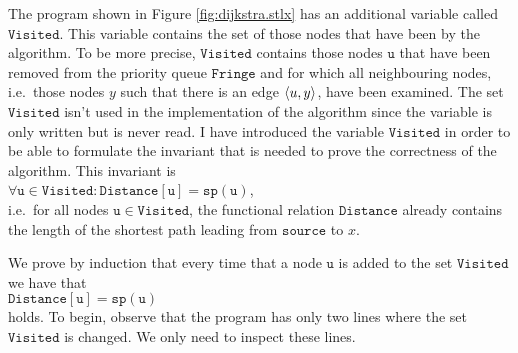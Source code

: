 The program shown in Figure \ref{fig:dijkstra.stlx} has an additional variable called $\mathtt{Visited}$.
This variable contains the set of those nodes that have been   by the algorithm.
To be more precise, $\mathtt{Visited}$ contains those nodes $\mathtt{u}$ that have been removed from the
priority queue $\mathtt{Fringe}$ and for which all neighbouring nodes, i.e.~those nodes $y$ such that
there is an edge $\pair(u,y)$, have been examined.
The set $\mathtt{Visited}$ isn't used in the implementation of the algorithm since the variable is
only written but is never read.
I have introduced the variable $\mathtt{Visited}$ in order to be able to formulate the invariant that
is needed to prove the correctness of the algorithm.  This invariant is
\\[0.2cm]
\hspace*{1.3cm}
$\forall \mathtt{u}\in\mathtt{Visited}: \mathtt{Distance}[\mathtt{u}] = \mathtt{sp}(\mathtt{u})$,
\\[0.2cm]
i.e.~for all nodes $\mathtt{u} \in \mathtt{Visited}$, the functional relation $\mathtt{Distance}$
already contains the length of the shortest path leading from $\mathtt{source}$ to $x$.  
\vspace*{0.1cm}

\proof 
We prove by induction that every time that a node $\mathtt{u}$ is added to the set
$\mathtt{Visited}$ we have that
\\[0.2cm]
\hspace*{1.3cm}
$\mathtt{Distance}[\mathtt{u}] = \mathtt{sp}(\mathtt{u})$ 
\\[0.2cm]
holds.  To begin, observe that the program has only two lines where the set $\mathtt{Visited}$ is changed.
We only need to inspect these lines.

